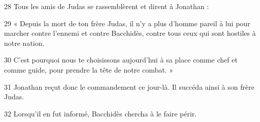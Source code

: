28 Tous les amis de Judas se rassemblèrent et dirent à Jonathan :

29 « Depuis la mort de ton frère Judas, il n’y a plus d’homme pareil à lui pour marcher contre l’ennemi et contre Bacchidès, contre tous ceux qui sont hostiles à notre nation.

30 C’est pourquoi nous te choisissons aujourd’hui à sa place comme chef et comme guide, pour prendre la tête de notre combat. »

31 Jonathan reçut donc le commandement ce jour-là. Il succéda ainsi à son frère Judas.

32 Lorsqu’il en fut informé, Bacchidès chercha à le faire périr.
